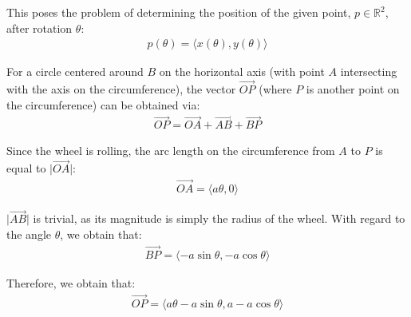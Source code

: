 \documentclass[12pt]{article}
\newcommand{\mo}[1]{\lvert #1 \rvert}
\newcommand{\RR}{\mathbb{R}}
\newcommand{\iv}[1]{\langle #1 \rangle}
\theoremstyle{definition}
\begin{document}
	This poses the problem of determining the position of the given point, $p \in \RR^2$, after rotation $\theta$:
	\begin{gather*}
		p(\theta) = \iv{x(\theta), y(\theta)}
	\end{gather*}
	
	For a circle centered around $B$ on the horizontal axis (with point $A$ intersecting with the axis on the circumference), the vector $\overrightarrow{OP}$ (where $P$ is another point on the circumference) can be obtained via:
	\begin{gather*}
		\overrightarrow{OP} = \overrightarrow{OA} + \overrightarrow{AB} + \overrightarrow{BP}
	\end{gather*}
	
	Since the wheel is rolling, the arc length on the circumference from $A$ to $P$ is equal to $\mo{\overrightarrow{OA}}$:
	\begin{gather*}
		\overrightarrow{OA} = \iv{a \theta, 0}
	\end{gather*}
	
	$\mo{\overrightarrow{AB}}$ is trivial, as its magnitude is simply the radius of the wheel. With regard to the angle $\theta$, we obtain that:
	\begin{gather*}
		\overrightarrow{BP} = \iv{-a \sin \theta, -a \cos \theta}
	\end{gather*}
	
	Therefore, we obtain that:
	\begin{gather*}
		\overrightarrow{OP} = \iv{a\theta - a \sin \theta, a - a \cos \theta}
 	\end{gather*}
	
\end{document}
